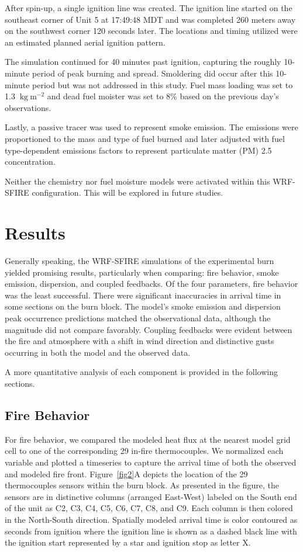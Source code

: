 \documentclass[preprints,article,accept,moreauthors,pdftex]{Definitions/mdpi}
\begin{document}
After spin-up, a single ignition line was created. The ignition line started on the southeast corner of Unit 5 at 17:49:48 MDT and was completed 260 meters away on the southwest corner 120 seconds later. The locations and timing utilized were an estimated planned aerial ignition pattern.

The simulation continued for 40 minutes past ignition, capturing the roughly 10-minute period of peak burning and spread. Smoldering did occur after this 10-minute period but was not addressed in this study. Fuel mass loading was set to 1.3 $\mathrm{~kg}\mathrm{~m}^{-2}$ and dead fuel moister was set to 8$\%$ based on the previous day’s observations.

Lastly, a passive tracer was used to represent smoke emission. The emissions were proportioned to the mass and type of fuel burned and later adjusted with fuel type-dependent emissions factors to represent particulate matter (PM) 2.5 concentration.

Neither the chemistry nor fuel moisture models were activated within this WRF-SFIRE configuration. This will be explored in future studies.
\section{Results}

Generally speaking, the WRF-SFIRE simulations of the experimental burn yielded promising results, particularly when comparing: fire behavior, smoke emission, dispersion, and coupled feedbacks. Of the four parameters, fire behavior was the least successful. There were significant inaccuracies in arrival time in some sections on the burn block. The model’s smoke emission and dispersion peak occurrence predictions matched the observational data, although the magnitude did not compare favorably.
Coupling feedbacks were evident between the fire and atmosphere with a shift in wind direction and distinctive gusts occurring in both the model and the observed data.

A more quantitative analysis of each component is provided in the following sections.

\subsection{Fire Behavior}

For fire behavior, we compared the modeled heat flux at the nearest model grid cell to one of the corresponding 29 in-fire thermocouples. We normalized each variable and plotted a timeseries to capture the arrival time of both the observed and modeled fire front. Figure~\ref{fig2}A depicts the location of the 29 thermocouples sensors within the burn block. As presented in the figure, the sensors are in distinctive columns (arranged East-West) labeled on the South end of the unit as C2, C3, C4, C5, C6, C7, C8, and C9. Each column is then colored in the North-South direction. Spatially modeled arrival time is color contoured as seconds from ignition where the ignition line is shown as a dashed black line with the ignition start represented by a star and ignition stop as letter X.
\end{document}
